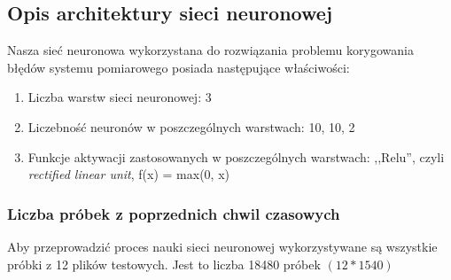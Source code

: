 \documentclass{classrep}
\begin{document}
\subsection{Opis architektury sieci neuronowej}
Nasza sieć neuronowa wykorzystana do rozwiązania problemu korygowania błędów systemu pomiarowego posiada następujące właściwości:
\begin{enumerate}
	\item Liczba warstw sieci neuronowej: 3
	\item Liczebność neuronów w poszczególnych warstwach: 10, 10, 2
	\item Funkcje aktywacji zastosowanych w poszczególnych warstwach: ,,Relu'', czyli  \textsl{rectified linear unit}, f(x) = max(0, x)
\end{enumerate}

\subsubsection{Liczba próbek z poprzednich chwil czasowych} 
Aby przeprowadzić proces nauki sieci neuronowej wykorzystywane są wszystkie próbki z 12 plików testowych. Jest to liczba 18480 próbek $(12 * 1540)$
\end{document}
